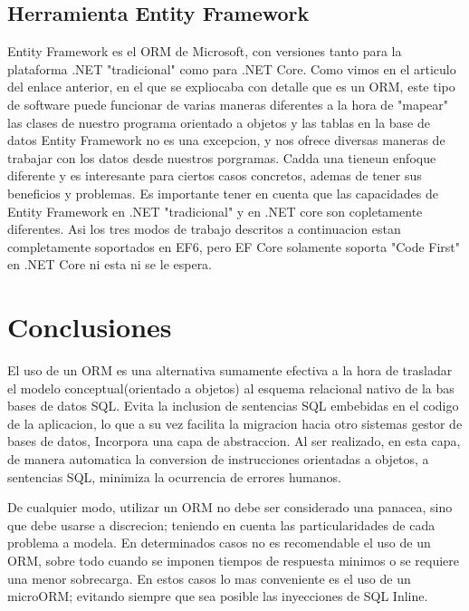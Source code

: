 \documentclass[twoside,twocolumn]{article}
\begin{document}
 \subsection{Herramienta Entity Framework}
 Entity Framework es el ORM de Microsoft, con versiones tanto para la plataforma .NET "tradicional"
 como para .NET Core. 
 Como vimos en el articulo del enlace anterior, en el que se expliocaba con detalle que es un ORM, este tipo de software
 puede funcionar de varias maneras diferentes a la hora de "mapear" las clases de nuestro programa orientado a objetos y las tablas en la 
 base de datos 
 Entity Framework no es una excepcion, y nos ofrece diversas maneras de trabajar con los datos desde nuestros porgramas. 
 Cadda una tieneun enfoque diferente y es interesante para ciertos casos concretos, ademas de tener sus beneficios y problemas.
 Es importante tener en cuenta que las capacidades de Entity Framework en .NET "tradicional" y en .NET core son copletamente 
 diferentes.
Asi los tres modos de trabajo descritos a continuacion estan completamente soportados en EF6, pero EF Core solamente soporta "Code First" en .NET
Core ni esta ni se le espera.
\section{Conclusiones}
El uso de un ORM es una alternativa sumamente efectiva a la hora de trasladar el modelo conceptual(orientado a objetos)
al esquema relacional nativo de la bas bases de datos SQL. Evita la inclusion de sentencias SQL embebidas en el codigo de la aplicacion, lo que a su vez facilita la migracion
hacia otro sistemas gestor de bases de datos, Incorpora una capa de abstraccion. Al ser realizado, en esta capa, de manera automatica la conversion de 
instrucciones orientadas a objetos, a sentencias SQL, minimiza la ocurrencia de errores humanos.

De cualquier modo, utilizar un ORM no debe ser considerado una panacea, sino que debe usarse a discrecion; teniendo en cuenta las 
particularidades de cada problema a modela. En determinados casos no es recomendable el uso de un ORM,
sobre todo cuando se imponen tiempos de respuesta minimos o se requiere una menor sobrecarga. En estos casos lo mas conveniente es el uso de un 
microORM; evitando siempre que sea posible las inyecciones de SQL Inline.
\end{document}
